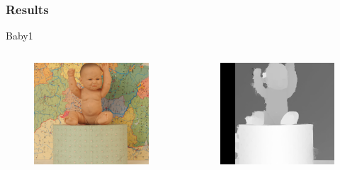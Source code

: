 \documentclass{beamer}
\begin{document}
\begin{frame}
\frametitle{Results}
Baby1
\begin{columns}[c] %

\begin{figure}
\includegraphics[width=0.7\linewidth]{../program/dataset/Baby1/view1.png}
\end{figure}

\begin{figure}
\includegraphics[width=0.7\linewidth]{../program/Result/Baby1.png}
\end{figure}

\end{columns}
\end{frame}

\end{document}

